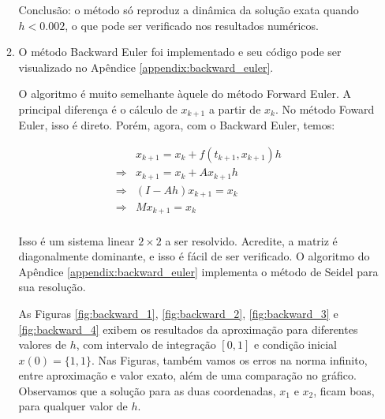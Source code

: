 \documentclass{article}
\begin{document}
\begin{enumerate}
\begin{enumerate}
                    Conclusão: o método só reproduz a dinâmica da solução
                    exata quando $h < 0.002$, o que pode ser verificado nos
                    resultados numéricos.

                \item O método Backward Euler foi implementado e seu código
                    pode ser visualizado no Apêndice \ref{appendix:backward_euler}.
                    
                    O algoritmo é muito semelhante àquele do método Forward Euler.
                    A principal diferença é o cálculo de $x_{k+1}$ a partir de
                    $x_k$. No método Foward Euler, isso é direto. Porém, agora,
                    com o Backward Euler, temos:

                    \begin{align*}
                        &x_{k+1} = x_k + f(t_{k+1}, x_{k+1}) h \\
                        \Rightarrow &x_{k+1} = x_k + Ax_{k+1} h \\
                        \Rightarrow &(I - Ah)x_{k+1} = x_k \\
                        \Rightarrow &M x_{k+1} = x_k \\
                    \end{align*}

                    Isso é um sistema linear $2\times2$ a ser resolvido. Acredite, a matriz
                    é diagonalmente dominante, e isso é fácil de ser verificado.
                    O algoritmo do Apêndice \ref{appendix:backward_euler} implementa
                    o método de Seidel para sua resolução.

                    As Figuras \ref{fig:backward_1}, \ref{fig:backward_2},
                    \ref{fig:backward_3} e \ref{fig:backward_4}
                    exibem os resultados da aproximação para diferentes
                    valores de $h$, com intervalo de integração $[0, 1]$
                    e condição inicial $x(0) = \{1, 1\}$. Nas Figuras,
                    também vamos os erros na norma infinito, entre
                    aproximação e valor exato, além de uma comparação
                    no gráfico. Observamos que a solução para as duas
                    coordenadas, $x_1$ e $x_2$, ficam boas, para qualquer
                    valor de $h$.
                

\end{enumerate}
\end{enumerate}
\end{document}
